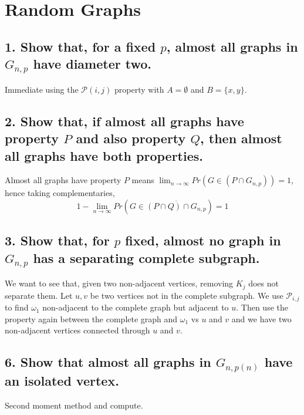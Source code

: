 \section{Random Graphs}

\subsection[Random Graphs - 1]{1. Show that, for a fixed $p$, almost all graphs in $G_{n,p}$ have diameter two.}

Immediate using the $\mathcal{P}(i,j)$ property with $A = \emptyset$ and $B = \{ x, y \}$.

\subsection[Random Graphs - 2]{2. Show that, if almost all graphs have property $P$ and also property $Q$, then almost all graphs have both properties.}

Almost all graphs have property $P$ means $\lim_{n \rightarrow \infty} Pr(G \in (P \cap G_{n,p})) = 1$, hence taking complementaries,
$$1 - \lim_{n \rightarrow \infty} Pr(G \in \overline{(P \cap Q) \cap G_{n,p}}) = 1$$

\subsection[Random Graphs - 3]{3. Show that, for $p$ fixed, almost no graph in $G_{n,p}$ has a separating complete subgraph.}

We want to see that, given two non-adjacent vertices, removing $K_j$ does not separate them.
Let $u,v$ be two vertices not in the complete subgraph. We use $\mathcal{P}_{i,j}$ to find $\omega_1$ non-adjacent to the complete graph but adjacent to $u$.
Then use the property again between the complete graph and $\omega_1$ vs $u$ and $v$ and we have two non-adjacent vertices connected through $u$ and $v$.

\subsection[Random Graphs - 6]{6. Show that almost all graphs in $G_{n,p(n)}$ have an isolated vertex.}

Second moment method and compute.
